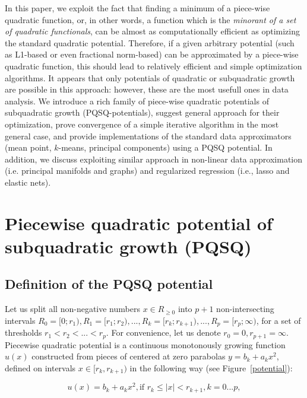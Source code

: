 \documentclass[preprint,12pt,twocolumn]{elsarticle}
\begin{document}
In this paper, we exploit the fact that finding a minimum of a piece-wise quadratic function, or, in other words, a function which is the {\it minorant of a set of quadratic functionals}, can be almost as computationally efficient as optimizing the standard quadratic potential. Therefore, if a given arbitrary potential (such as L1-based or even fractional norm-based) can be approximated by a piece-wise quadratic function, this should lead to relatively efficient and simple optimization algorithms. It appears that only potentials of quadratic or subquadratic growth are possible in this approach: however, these are the most usefull ones in data analysis. We introduce a rich family of piece-wise quadratic potentials of subquadratic growth (PQSQ-potentials), suggest general approach for their optimization, prove convergence of a simple iterative algorithm in the most general case, and provide implementations of the standard data approximators (mean point, $k$-means, principal components) using a PQSQ potential. In addition, we discuss exploiting similar approach in non-linear data approximation (i.e. principal manifolds and graphs) and regularized regression (i.e., lasso and elastic nets).


\section{Piecewise quadratic potential of subquadratic growth (PQSQ)}
\label{S:2}

\subsection{Definition of the PQSQ potential}

Let us split all non-negative numbers $x\in R_{\geq 0}$ into $p+1$ non-intersecting intervals $R_0=[0;r_1), R_1=[r_1;r_2), ... , R_k=[r_k;r_{k+1}), ..., R_p=[r_p;\infty)$,  for a set of thresholds $r_1<r_2<...<r_p$. For convenience, let us denote $r_0=0, r_{p+1} = \infty$. Piecewise quadratic potential is a continuous monotonously growing function $u(x)$ constructed from pieces of centered at zero parabolas $y=b_k+a_kx^2$, defined on intervals $x\in[r_k,r_{k+1})$ in the following way (see Figure~\ref{potential}):

\begin{equation}\label{PQSQ_f}
u(x)=
b_k+a_kx^2, \mbox{if } r_k \leq |x|<r_{k+1}, k=0...p,
\end{equation}
\end{document}
